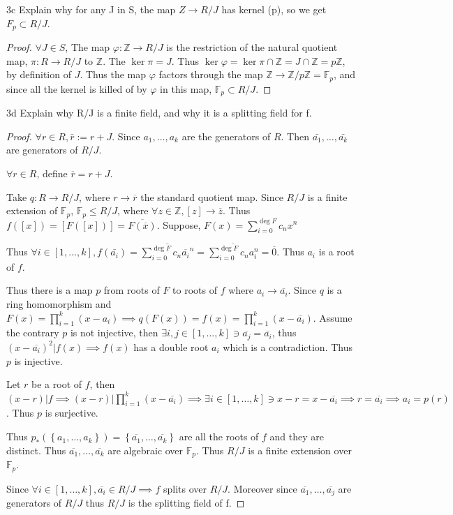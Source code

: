\documentclass{article}
\newcommand{\Z}{\mathbb{Z}}
\newcommand{\F}{\mathbb{F}}
\begin{document}
\begin{PROB}{3c}\label{Problem 3c.}
    Explain why for any J in S, the map $Z \to R/J$ has kernel (p), so we get $F_p \subset R/J$.
\end{PROB}
\begin{proof}
    $\forall J \in S$, The map $\varphi: \Z \to R / J$ is the restriction of the natural quotient map, $\pi : R \to R / J$ to $\Z$. The $\ker \pi = J$. Thus $\ker \varphi = \ker \pi \cap \Z = J \cap \Z = p\Z$, by definition of $J$. Thus the map $\varphi$ factors through the map $\Z \to \Z / p\Z = \F_p$, and since all the kernel is killed of by $\varphi$ in this map, $\F_p \subset R / J$.         
\end{proof}
\begin{PROB}{3d}\label{Problem 3d.}
    Explain why R/J is a finite field, and why it is a splitting field for f.   
\end{PROB}
\begin{proof}
    $\forall r \in R, \bar{r} := r + J$.
    Since $a_1, \dots, a_k$ are the generators of $R$. Then $\bar{a_1}, \dots, \bar{a_k}$ are generators of $R / J$. 
    
    $\forall r \in R$, define $\overline{r} = r + J$.  

    Take $q: R \to R / J$, where $r \to \overline{r}$ the standard quotient map. Since $R / J$ is a finite extension of $\F_p$, $\F_p \leq R / J$, where $\forall z \in \Z, [z] \to \overline{z}$. 
    Thus $f([x]) = [F([x])] = \overline{F(\overline{x})}$. Suppose, $F(x) = \sum_{i = 0}^{\deg F} c_n x^n$  
    
    Thus $\forall i \in [1, \dots, k], f(\bar{a_i}) = \overline{\sum_{i = 0}^{\deg F} c_n \overline{a_i}^n} = \overline{\sum_{i = 0}^{\deg F} c_n a_i^n} = \overline{0}$. Thus $a_i$ is a root of $f$. 
    
    Thus there is a map $p$ from roots of $F$ to roots of $f$ where $a_i \to \overline{a_i}$. Since $q$ is a ring homomorphism and $F(x) = \prod_{i = 1}^{k}(x - a_i) \implies q(F(x)) = f(x) = \prod_{i = 1}^{k}(x - \overline{a_i})$. Assume the contrary $p$ is not injective, then $\exists i, j \in [1, \dots, k] \ni \overline{a_j} = \overline{a_i}$, thus $(x - \overline{a_i})^2 | f(x) \implies f(x)$ has a double root $a_i$ which is a contradiction. Thus $p$ is injective.
    
    Let $r$ be a root of $f$, then $(x - r) | f \implies (x - r) | \prod_{i = 1}^{k}(x - \overline{a_i}) \implies \exists i \in [1, \dots, k] \ni x - r = x - \overline{a_i} \implies r = \overline{a_i} \implies a_i = p(r)$. Thus $p$ is surjective. 

    Thus $p_*(\left\{ a_1, \dots, a_k \right\}) = \left\{ \overline{a_1}, \dots, \overline{a_k} \right\}$ are all the roots of $f$ and they are distinct. Thus $\overline{a_1}, \dots, \overline{a_k}$ are algebraic over $\F_p$. Thus $R / J$ is a finite extension over $\F_p$.     
    
    Since $\forall i \in [1, \dots, k], \overline{a_i} \in R / J \implies f$ splits over $R / J$. Moreover since $\overline{a_1}, \dots, \overline{a_j}$ are generators of $R / J$ thus $R / J$ is the splitting field of f. 
\end{proof}
\end{document}
